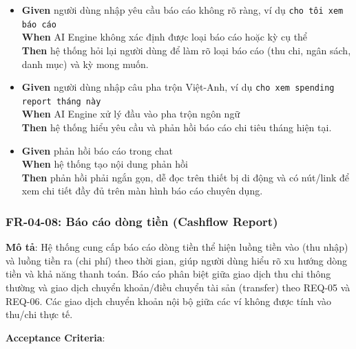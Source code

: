 \begin{itemize}
\item \textbf{Given} người dùng nhập yêu cầu báo cáo không rõ ràng, ví dụ \texttt{cho tôi xem báo cáo}  \\ \hspace*{1.5em}  \textbf{When} AI Engine không xác định được loại báo cáo hoặc kỳ cụ thể  \\ \hspace*{1.5em}  \textbf{Then} hệ thống hỏi lại người dùng để làm rõ loại báo cáo (thu chi, ngân sách, danh mục) và kỳ mong muốn.
\item \textbf{Given} người dùng nhập câu pha trộn Việt-Anh, ví dụ \texttt{cho xem spending report tháng này}  \\ \hspace*{1.5em}  \textbf{When} AI Engine xử lý đầu vào pha trộn ngôn ngữ  \\ \hspace*{1.5em}  \textbf{Then} hệ thống hiểu yêu cầu và phản hồi báo cáo chi tiêu tháng hiện tại.
\item \textbf{Given} phản hồi báo cáo trong chat  \\ \hspace*{1.5em}  \textbf{When} hệ thống tạo nội dung phản hồi  \\ \hspace*{1.5em}  \textbf{Then} phản hồi phải ngắn gọn, dễ đọc trên thiết bị di động và có nút/link để xem chi tiết đầy đủ trên màn hình báo cáo chuyên dụng.
\end{itemize}
\subsubsection{FR-04-08: Báo cáo dòng tiền (Cashflow Report)}

\textbf{Mô tả}: Hệ thống cung cấp báo cáo dòng tiền thể hiện luồng tiền vào (thu nhập) và luồng tiền ra (chi phí) theo thời gian, giúp người dùng hiểu rõ xu hướng dòng tiền và khả năng thanh toán. Báo cáo phân biệt giữa giao dịch thu chi thông thường và giao dịch chuyển khoản/điều chuyển tài sản (transfer) theo REQ-05 và REQ-06. Các giao dịch chuyển khoản nội bộ giữa các ví không được tính vào thu/chi thực tế.



\textbf{Acceptance Criteria}:

